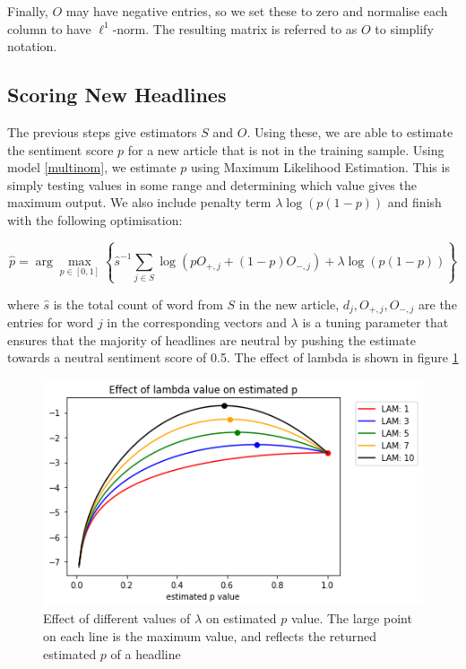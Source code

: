 \noindent
Finally, $O$ may have negative entries, so we set these to zero and normalise each column to have $\ell^1$-norm. The resulting matrix is referred to as $O$ to simplify notation.

\subsection{Scoring New Headlines}
\label{new-headlines}

The previous steps give estimators $S$ and $O$. Using these, we are able to estimate the sentiment score $p$ for a new article that is not in the training sample. Using model \ref{multinom}, we estimate $p$ using Maximum Likelihood Estimation. This is simply testing values in some range and determining which value gives the maximum output. We also include penalty term $\lambda \log(p(1-p))$ and finish with the following optimisation:

\begin{equation}
\widehat p = \arg \max_{p \in [0,1]} \left\{ \widehat s^{-1} \sum_{j \in S} \log (p O_{+,j} + (1-p) O_{-,j}) + \lambda \log(p(1-p)) \right\}
\end{equation}

\noindent
where $\widehat s$ is the total count of word from $S$ in the new article, $d_j, O_{+,j}, O_{-,j}$ are the entries for word $j$ in the corresponding vectors and $\lambda$ is a tuning parameter that ensures that the majority of headlines are neutral by pushing the estimate towards a neutral sentiment score of 0.5. The effect of lambda is shown in figure \ref{fig:lam-effect}

\begin{figure}[!t]
    \begin{center}
        \includegraphics[scale=.75]{./pics/lam-effect.png}
        \caption[Effect of $\lambda$]{Effect of different values of $\lambda$ on estimated $p$ value. The large point on each line is the maximum value, and reflects the returned estimated $p$ of a headline}
        \label{fig:lam-effect}
    \end{center}
\end{figure}

